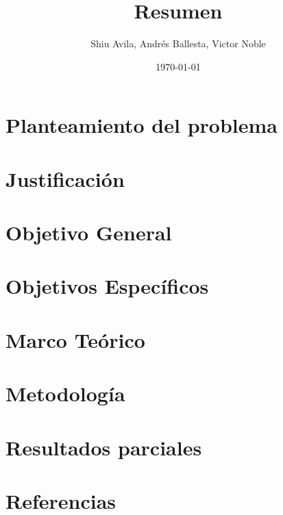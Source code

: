 \documentclass[12pt,a4paper]{article}
\title{Resumen}
\author{Shiu Avila, Andrés Ballesta, Victor Noble}
\date{\today}
\begin{document}
\maketitle

\section{Planteamiento del problema}
\section{Justificación}
\section{Objetivo General}
\section{Objetivos Específicos}
\section{Marco Teórico}
\section{Metodología}
\section{Resultados parciales}
\section{Referencias}
\end{document}
